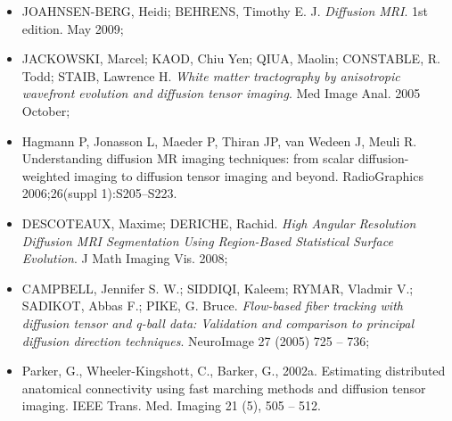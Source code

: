 \documentclass[a4paper,11pt]{report}
\begin{document}
\begin{itemize}
  \item JOAHNSEN-BERG, Heidi; BEHRENS, Timothy E. J. \textit{Diffusion MRI}. 1st edition. May 2009;
  \item JACKOWSKI, Marcel; KAOD, Chiu Yen; QIUA, Maolin; CONSTABLE, R. Todd; STAIB, Lawrence H. \textit{White matter tractography by anisotropic wavefront evolution and diffusion tensor imaging}. Med Image Anal. 2005 October;
  \item Hagmann P, Jonasson L, Maeder P, Thiran JP, van Wedeen J, Meuli R. Understanding diffusion MR imaging techniques: from scalar diffusion-weighted imaging to diffusion tensor imaging and beyond. RadioGraphics 2006;26(suppl 1):S205–S223.
  \item DESCOTEAUX, Maxime; DERICHE, Rachid. \textit{High Angular Resolution Diffusion MRI Segmentation Using
Region-Based Statistical Surface Evolution}. J Math Imaging Vis. 2008;
  \item CAMPBELL, Jennifer S. W.; SIDDIQI, Kaleem; RYMAR, Vladmir V.; SADIKOT, Abbas F.; PIKE, G. Bruce. \textit{Flow-based fiber tracking with diffusion tensor and q-ball data: Validation and comparison to principal diffusion direction techniques}. NeuroImage 27 (2005) 725 – 736;
  \item Parker, G., Wheeler-Kingshott, C., Barker, G., 2002a. Estimating distributed anatomical connectivity using fast marching methods and diffusion tensor imaging. IEEE Trans. Med. Imaging 21 (5), 505 – 512.
\end{itemize}
\end{document}
